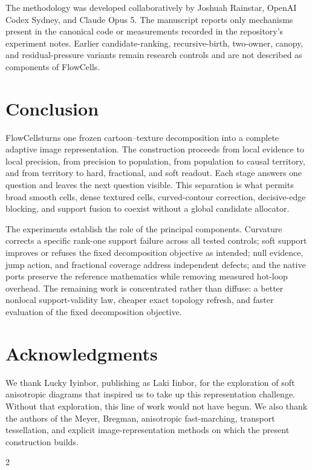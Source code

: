 \documentclass[11pt,letterpaper]{article}
\newcommand{\method}{FlowCells}
\begin{document}
The methodology was developed collaboratively by Joshuah Rainstar, OpenAI Codex
Sydney, and Claude Opus 5. The manuscript reports only mechanisms present in the
canonical code or measurements recorded in the repository's experiment notes. Earlier
candidate-ranking, recursive-birth, two-owner, canopy, and residual-pressure variants
remain research controls and are not described as components of \method.

\section{Conclusion}
\label{sec:conclusion}

\method turns one frozen cartoon--texture decomposition into a complete adaptive image
representation. The construction proceeds from local evidence to local precision, from
precision to population, from population to causal territory, and from territory to
hard, fractional, and soft readout. Each stage answers one question and leaves the next
question visible. This separation is what permits broad smooth cells, dense textured
cells, curved-contour correction, decisive-edge blocking, and support fusion to coexist
without a global candidate allocator.

The experiments establish the role of the principal components. Curvature corrects a
specific rank-one support failure across all tested controls; soft support improves or
refuses the fixed decomposition objective as intended; null evidence, jump action, and
fractional coverage address independent defects; and the native ports preserve the
reference mathematics while removing measured hot-loop overhead. The remaining work is
concentrated rather than diffuse: a better nonlocal support-validity law, cheaper exact
topology refresh, and faster evaluation of the fixed decomposition objective.

\section*{Acknowledgments}

We thank Lucky Iyinbor, publishing as Laki Iinbor, for the exploration of soft
anisotropic diagrams that inspired us to take up this representation challenge. Without
that exploration, this line of work would not have begun. We also thank the authors of
the Meyer, Bregman, anisotropic fast-marching, transport tessellation, and explicit
image-representation methods on which the present construction builds.

\begingroup
\small
\setlength{\bibsep}{2.2pt}
\begin{multicols}{2}


\end{multicols}
\endgroup
\end{document}
